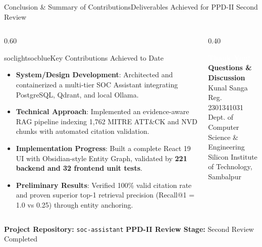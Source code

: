 \documentclass[aspectratio=169, 10pt]{beamer}
\begin{document}
\begin{frame}{Conclusion \& Summary of Contributions}{Deliverables Achieved for PPD-II Second Review}
  \begin{columns}[T]
    \begin{column}{0.60\textwidth}
      \begin{cardbox}{soclight}{socblue}{Key Contributions Achieved to Date}
        \begin{itemize}\setlength{\itemsep}{2pt}
          \item \textbf{System/Design Development}: Architected and containerized a multi-tier SOC Assistant integrating PostgreSQL, Qdrant, and local Ollama.
          \item \textbf{Technical Approach}: Implemented an evidence-aware RAG pipeline indexing 1,762 MITRE ATT\&CK and NVD chunks with automated citation validation.
          \item \textbf{Implementation Progress}: Built a complete React 19 UI with Obsidian-style Entity Graph, validated by \textbf{221 backend and 32 frontend unit tests}.
          \item \textbf{Preliminary Results}: Verified 100\% valid citation rate and proven superior top-1 retrieval precision (Recall@1 = 1.0 vs 0.25) through entity anchoring.
        \end{itemize}
      \end{cardbox}
    \end{column}

    \begin{column}{0.40\textwidth}
      \begin{tcolorbox}[colback=socnavy,colframe=socblue,boxrule=1pt,arc=2mm,center,top=8pt,bottom=8pt]
        \centering
        \textcolor{white}{\large\textbf{Thank You!}}\\[6pt]
        \textcolor{soccyan}{\footnotesize\textbf{Questions \& Discussion}}\\[10pt]
        \textcolor{white!80}{\scriptsize Kunal Sanga \quad\textbar\quad Reg. 2301341031}\\
        \textcolor{white!70}{\scriptsize Dept. of Computer Science \& Engineering}\\
        \textcolor{white!70}{\scriptsize Silicon Institute of Technology, Sambalpur}
      \end{tcolorbox}
    \end{column}
  \end{columns}

  \vspace{0.15cm}
  \centering
  \textcolor{socmuted}{\scriptsize\textbf{Project Repository:} \texttt{soc-assistant} \quad\textbar\quad \textbf{PPD-II Review Stage:} Second Review Completed}
\end{frame}
\end{document}
